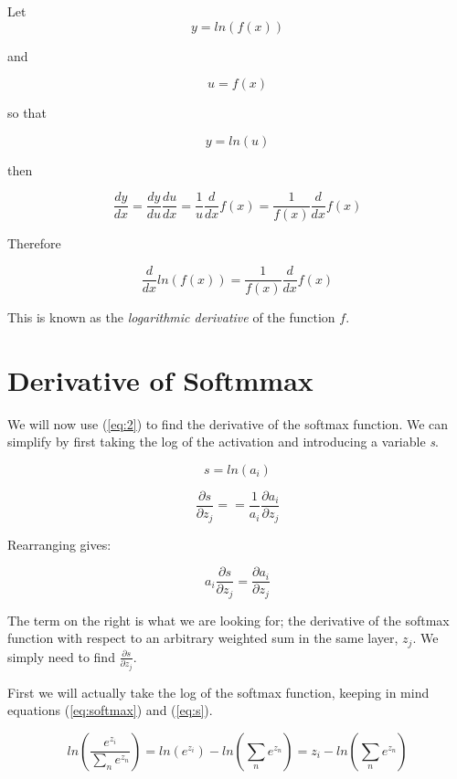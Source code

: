 \documentclass[12pt]{article}
\begin{document}
Let
$$
y=ln(f(x))
$$

and

$$
u=f(x)
$$

so that

$$
y=ln(u)
$$

then

$$
\frac{dy}{dx}=\frac{dy}{du}\frac{du}{dx}=\frac{1}{u}\frac{d}{d x}f(x)=\frac{1}{f(x)}\frac{d}{dx}f(x)
$$

Therefore

\begin{equation} \label{eq:2}
        \boxed{
                \frac{d}{dx}ln(f(x))=
                \frac{1}{f(x)}\frac{d}{dx}f(x)
        }
\end{equation}
\bigskip

This is known as the \textit{logarithmic derivative} of the function $f$.

\section{Derivative of Softmmax}


\bigskip
We will now use (\ref{eq:2}) to find the derivative of the softmax function. We can simplify by first taking the log of the activation and introducing a variable \textit{s}.

\begin{equation} \label{eq:s}
s=ln(a_i)
\end{equation}

$$
\frac{\partial s}{\partial z_j}=
=\frac{1}{a_i}\frac{\partial a_i}{\partial z_j}
$$

Rearranging gives:

\begin{equation} \label{eq:3}
a_i\frac{\partial s}{\partial z_j}
=\frac{\partial a_i}{\partial z_j}
\end{equation}

The term on the right is what we are looking for; the derivative of the softmax function with respect to an arbitrary weighted sum in the same layer, $z_j$. We simply need to find $\frac{\partial s}{\partial z_j}$.

First we will actually take the log of the softmax function, keeping in mind equations (\ref{eq:softmax}) and (\ref{eq:s}).

$$
        ln\left( \frac{e^{z_i}}{\sum_n e^{z_n}} \right)
        =ln(e^{z_i}) - ln(\sum_n e^{z_n})
        =z_i - ln(\sum_n e^{z_n})
$$

\bigskip
\end{document}

